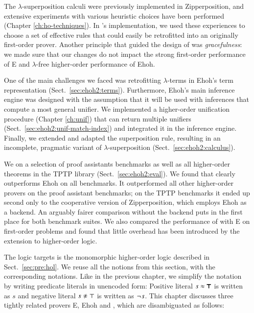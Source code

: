 %
The $\lambda$-superposition calculi were
previously implemented in Zipperposition, and
extensive experiments with various heuristic choices have been performed
(Chapter \ref{ch:ho-techniques}). In \ehohii{}'s implementation, we used
these experiences to choose a set of effective rules that could easily be
retrofitted into an originally first-order prover. Another principle that guided 
the design of \ehohii{} was \emph{gracefulness}: we made sure that our changes
do not impact the strong first-order performance of E and $\lambda$-free higher-order performance of Ehoh. 


One of the main challenges we faced was retrofitting $\lambda$-terms in Ehoh's
term representation (Sect.~\ref{sec:ehoh2:terms}). Furthermore, Ehoh's main inference
engine was designed with the assumption that it will be used with
inferences that compute a most general unifier. We
implemented a higher-order unification procedure (Chapter \ref{ch:unif})
that can return multiple unifiers (Sect.~\ref{sec:ehoh2:unif-match-index}) and
integrated it in the inference engine. Finally, we extended and adapted the
superposition rule, resulting in an incomplete, pragmatic variant of
$\lambda$-superposition (Sect.~\ref{sec:ehoh2:calculus}).

We  \ehohii{} on a selection of proof assistants benchmarks
as well as all higher-order theorems in the TPTP library \cite{gs-17-tptp}
(Sect.~\ref{sec:ehoh2:eval}). We found
that \ehohii{} clearly outperforms Ehoh on all benchmarks. It outperformed all other higher-order provers on the
proof assistant benchmarks; on the TPTP benchmarks it ended up second only 
to the cooperative version of Zipperposition, which employs Ehoh as a
backend. An arguably fairer comparison without the backend puts \ehohii{} in the
first place for both benchmark suites.
We also compared the performance of \ehohii{} with E on first-order
problems and found that little overhead has been introduced by the
extension to higher-order logic.

 The logic \ehohii{} targets is the monomorphic higher-order
logic described in Sect.~\ref{sec:pre:hol}. We reuse all the notions from this
section, with the corresponding notations. Like in the previous chapter, we
simplify the notation by writing predicate literals in unencoded form: Positive
literal $s \approx \pmb{\top}$ is written as $s$ and negative literal
$\neqlit{s}{\top}$ is written as $\neg{\kern.2ex s}$.   This chapter discusses
three tightly related provers E, Ehoh and \ehohii{}, which are disambiguated as
follows:

